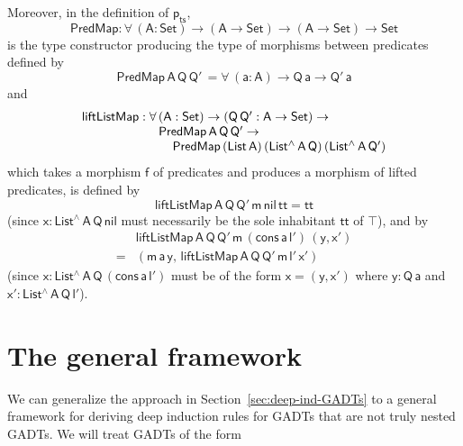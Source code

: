 \documentclass[sigplan,10pt]{acmart}
\begin{document}
Moreover, in the definition of $\mathsf{p_{ts}}$, \[\mathsf{PredMap :
  \forall\, (A : Set) \to (A \to Set) \to (A \to
  Set) \to Set }\] is the type constructor producing the type of
morphisms between predicates defined by
\[\mathsf{PredMap \,A\, Q\,Q'\,
  = \forall\, (a : A) \to Q\,a \to Q'\,a}\] and
\[\begin{array}{l}
\mathsf{liftListMap : \forall\, (A : Set) \to (Q \, Q' : A \to Set)
  \to}\\\
\hspace*{0.8in}\mathsf{PredMap\,A\,Q\,Q' \to}\\
\hspace*{1in}\mathsf{PredMap\,(List\,A)
  \,(List^{\wedge}\, A\, Q)\, (List^{\wedge}\, A\, Q')}
\end{array}\]
which takes a morphism $\mathsf{f}$ of predicates and produces a
morphism of lifted predicates, is defined by
\[\mathsf{liftListMap\, A\, Q\, Q'\, m\, nil\, tt = tt}\]
(since $\mathsf{x : List^{\wedge}\,
  A\, Q\, nil}$ must necessarily be the sole inhabitant $\mathsf{tt}$
of $\mathsf{\top}$), and by
\[\begin{array}{ll}
 & \mathsf{liftListMap\, A\, Q\, Q'\, m\,
  (cons\, a\, l')\, (y, x')}\\
= & \mathsf{(m\,a\,y, \,liftListMap\, A\,
  Q\, Q'\, m\, l'\, x')}
\end{array}\] (since $\mathsf{x : List^{\wedge}\, A\,
  Q\, (cons\, a\, l')}$ must be of the form $\mathsf{x = (y, x')}$
where $\mathsf{y : Q\,a}$ and $\mathsf{x' : List^{\wedge}\, A\, Q\,
  l'}$).

\vspace*{-0.05in}

\section{The general framework}\label{sec:framework}

We can generalize the approach in Section~\ref{sec:deep-ind-GADTs} to
a general framework for deriving deep induction rules for GADTs that
are not truly nested GADTs. We will treat GADTs of the form
\end{document}
